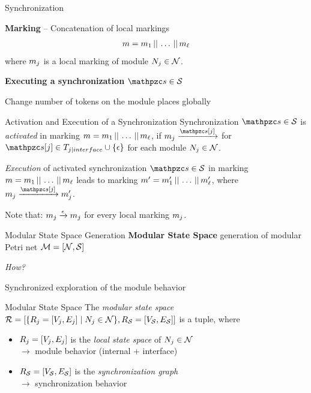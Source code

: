 \documentclass[11pt]{presentation}
\begin{document}
\begin{frame}{Synchronization}

	\textbf{Marking} -- Concatenation of local markings \\
	\begin{align*}
		\concatmarking
	\end{align*}
	where $ \localmarking{j} $ is a local marking of module $ \module{j} \in \modules $.

	\bigskip
	\textbf{Executing a synchronization} $ \synchronization \in \synchronizations $

	Change number of tokens on the module places globally \\

	\begin{defi}{Activation and Execution of a Synchronization}{}
		\smallskip
		Synchronization $ \synchronization \in \synchronizations $ is \emph{activated} in marking $ \concatmarking $, if $ \localmarking{j} \xrightarrow{\synchronization[j]} $ for $ \synchronization[j] \in \interfaces[j] \cup \set{\epsilon}$ for each module $ \module{j} \in \modules $.

		\smallskip
		\emph{Execution} of activated synchronization $ \synchronization \in \synchronizations $ in marking $ \concatmarking $ leads to marking $ \concatmarking[\prime] $, where $ \localmarking{j} \xrightarrow{\synchronization[j]} \localmarking{j}^\prime $.

		\smallskip
		Note that:  $ \localmarking{j} \xrightarrow{\epsilon} \localmarking{j} $ for every local marking $ \localmarking{j} $.
	\end{defi}
\end{frame}

\begin{frame}{Modular State Space Generation}
	\textbf{Modular State Space} generation of modular Petri net $ \ms[=] $

	\bigskip
	\emph{How?}

	Synchronized exploration of the module behavior

	\medskip

	\begin{defi}{Modular State Space \cite{gaede_modular_2024}}{}
		The \emph{modular state space} $ \crazy{R} = [\set{\lss{j}[=] \mid \module{j} \in \modules}, R_{\synchronizations}=[V_{\synchronizations},E_{\synchronizations}]] $ is a tuple, where
		\begin{itemize}
			\item $ \lss{j}[=] $ is the \emph{local state space} of $ \module{j} \in \modules $\\
			      $ \rightarrow $ module behavior (internal + interface)
			\item $ R_{\synchronizations}=[V_{\synchronizations},E_{\synchronizations}] $ is the \emph{synchronization graph}\\
			      $ \rightarrow $ synchronization behavior
		\end{itemize}
	\end{defi}

\end{frame}
\end{document}
